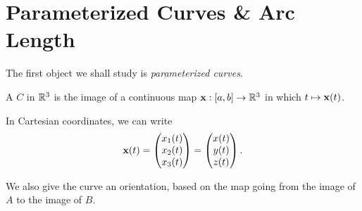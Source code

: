 \documentclass[a4paper]{scrreprt}
\begin{document}
\section{Parameterized Curves \& Arc Length}

The first object we shall study is \emph{parameterized curves}.

\begin{definition}
	A  $C$ in $\mathbb{R}^3$ is the image of a continuous map $\mathbf{x} : [a, b] \rightarrow \mathbb{R}^3$ in which $t \mapsto \mathbf{x}(t)$.
\end{definition}

In Cartesian coordinates, we can write
$$
\mathbf{x}(t) = \begin{pmatrix}
	x_1 (t) \\
	x_2 (t) \\
	x_3(t)
\end{pmatrix} = \begin{pmatrix}
	x (t) \\
	y (t) \\
	z (t)
\end{pmatrix}.
$$

We also give the curve an orientation, based on the map going from the image of $A$ to the image of $B$.
\end{document}
